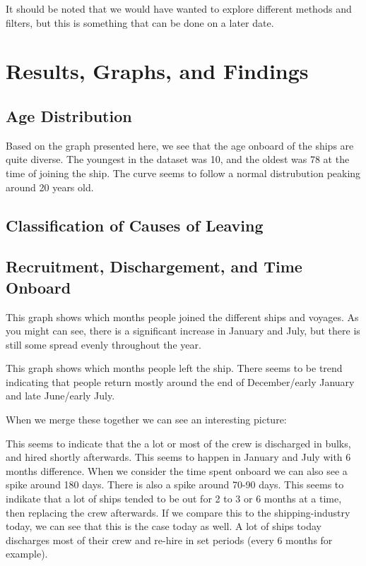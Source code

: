 \documentclass{article}
\begin{document}
It should be noted that we would have wanted to explore different methods and filters, but this is something that can be done on a later date.

\section{Results, Graphs, and Findings}

\subsection{Age Distribution}

Based on the graph presented here, we see that the age onboard of the ships are quite diverse. The youngest in the dataset was 10, and the oldest was 78 at the time of joining the ship. The curve seems to follow a normal distrubution peaking around 20 years old.

\subsection{Classification of Causes of Leaving}



\subsection{Recruitment, Dischargement, and Time Onboard}

This graph shows which months people joined the different ships and voyages. As you might can see, there is a significant increase in January and July, but there is still some spread evenly throughout the year.

This graph shows which months people left the ship. There seems to be trend indicating that people return mostly around the end of December/early January and late June/early July.

When we merge these together we can see an interesting picture:

This seems to indicate that the a lot or most of the crew is discharged in bulks, and hired shortly afterwards. This seems to happen in January and July with 6 months difference. When we consider the time spent onboard we can also see a spike around 180 days. There is also a spike around 70-90 days. This seems to indikate that a lot of ships tended to be out for 2 to 3 or 6 months at a time, then replacing the crew afterwards.
If we compare this to the shipping-industry today, we can see that this is the case today as well.
A lot of ships today discharges most of their crew and re-hire in set periods (every 6 months for example).
\end{document}
